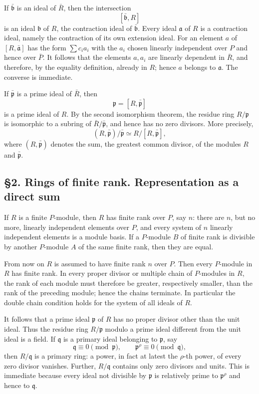 \documentclass[
  12pt,
]{article}
\begin{document}
If \(\bar{\mathfrak b}\) is an ideal of \(\bar R\), then the
intersection \[
  [\bar{\mathfrak b},R]
\] is an ideal \(\mathfrak b\) of \(R\), the contraction ideal of
\(\bar{\mathfrak b}\). Every ideal \(\mathfrak a\) of \(R\) is a
contraction ideal, namely the contraction of its own extension ideal.
For an element \(a\) of \([R,\bar{\mathfrak a}]\) has the form
\(\sum c_i a_i\) with the \(a_i\) chosen linearly independent over \(P\)
and hence over \(\bar P\). It follows that the elements \(a,a_i\) are
linearly dependent in \(\bar R\), and therefore, by the equality
definition, already in \(R\); hence \(a\) belongs to \(\mathfrak a\).
The converse is immediate.

If \(\bar{\mathfrak p}\) is a prime ideal of \(\bar R\), then \[
  \mathfrak p=[R,\bar{\mathfrak p}]
\] is a prime ideal of \(R\). By the second isomorphism theorem, the
residue ring \(R/\mathfrak p\) is isomorphic to a subring of
\(\bar R/\bar{\mathfrak p}\), and hence has no zero divisors. More
precisely, \[
  (R,\bar{\mathfrak p})/\bar{\mathfrak p}
  \simeq R/[R,\bar{\mathfrak p}],
\] where \((R,\bar{\mathfrak p})\) denotes the sum, the greatest common
divisor, of the modules \(R\) and \(\bar{\mathfrak p}\).

\subsection{§2. Rings of finite rank. Representation as a direct
sum}\label{rings-of-finite-rank.-representation-as-a-direct-sum}

If \(R\) is a finite \(P\)-module, then \(R\) has finite rank over
\(P\), say \(n\): there are \(n\), but no more, linearly independent
elements over \(P\), and every system of \(n\) linearly independent
elements is a module basis. If a \(P\)-module \(B\) of finite rank is
divisible by another \(P\)-module \(A\) of the same finite rank, then
they are equal.

From now on \(R\) is assumed to have finite rank \(n\) over \(P\). Then
every \(P\)-module in \(R\) has finite rank. In every proper divisor or
multiple chain of \(P\)-modules in \(R\), the rank of each module must
therefore be greater, respectively smaller, than the rank of the
preceding module; hence the chains terminate. In particular the double
chain condition holds for the system of all ideals of \(R\).

It follows that a prime ideal \(\mathfrak p\) of \(R\) has no proper
divisor other than the unit ideal. Thus the residue ring
\(R/\mathfrak p\) modulo a prime ideal different from the unit ideal is
a field. If \(\mathfrak q\) is a primary ideal belonging to
\(\mathfrak p\), say \[
  \mathfrak q\equiv0\pmod{\mathfrak p},
  \qquad
  \mathfrak p^{\rho}\equiv0\pmod{\mathfrak q},
\] then \(R/\mathfrak q\) is a primary ring: a power, in fact at latest
the \(\rho\)-th power, of every zero divisor vanishes. Further,
\(R/\mathfrak q\) contains only zero divisors and units. This is
immediate because every ideal not divisible by \(\mathfrak p\) is
relatively prime to \(\mathfrak p^{\rho}\) and hence to \(\mathfrak q\).
\end{document}
